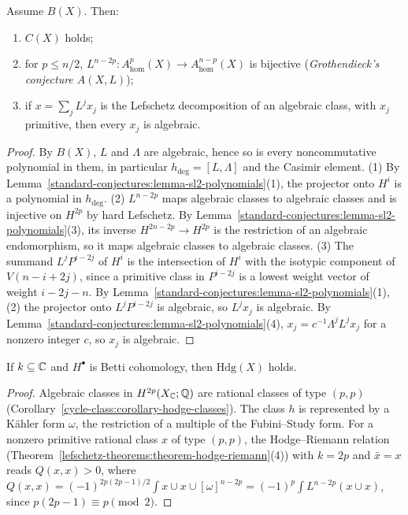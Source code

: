 \begin{proposition}\label{standard-conjectures:proposition-b-implies}
Assume $B(X)$. Then:
\begin{enumerate}
\item $C(X)$ holds;
\item for $p \leq n/2$, $L^{n-2p} \colon A^p_{\mathrm{hom}}(X) \to A^{n-p}_{\mathrm{hom}}(X)$ is bijective (\emph{Grothendieck's conjecture $A(X, L)$});
\item if $x = \sum_jL^jx_j$ is the Lefschetz decomposition of an algebraic class, with $x_j$ primitive, then every $x_j$ is algebraic.
\end{enumerate}
\end{proposition}

\begin{proof}
By $B(X)$, $L$ and $\Lambda$ are algebraic, hence so is every noncommutative polynomial in them, in particular $h_{\deg} = [L, \Lambda]$ and the Casimir element. (1) By
Lemma~\ref{standard-conjectures:lemma-sl2-polynomials}(1), the projector onto $H^i$ is a polynomial in $h_{\deg}$. (2) $L^{n-2p}$ maps algebraic classes to algebraic classes and is injective on $H^{2p}$ by hard
Lefschetz. By Lemma~\ref{standard-conjectures:lemma-sl2-polynomials}(3), its inverse $H^{2n-2p} \to H^{2p}$ is the restriction of an algebraic endomorphism, so it maps algebraic classes to algebraic classes.
(3) The summand $L^jP^{i-2j}$ of $H^i$ is the intersection of $H^i$ with the isotypic component of $V(n - i + 2j)$, since a primitive class in $P^{i-2j}$ is a lowest weight vector of weight $i - 2j - n$. By
Lemma~\ref{standard-conjectures:lemma-sl2-polynomials}(1),(2) the projector onto $L^jP^{i-2j}$ is algebraic, so $L^jx_j$ is algebraic. By Lemma~\ref{standard-conjectures:lemma-sl2-polynomials}(4),
$x_j = c^{-1}\Lambda^jL^jx_j$ for a nonzero integer $c$, so $x_j$ is algebraic.
\end{proof}

\begin{proposition}\label{standard-conjectures:proposition-hdg-char-zero}
If $k \subseteq \mathbb{C}$ and $H^\bullet$ is Betti cohomology, then $\mathrm{Hdg}(X)$ holds.
\end{proposition}

\begin{proof}
Algebraic classes in $H^{2p}(X_{\mathbb{C}}; \mathbb{Q})$ are rational classes of type $(p,p)$ (Corollary~\ref{cycle-class:corollary-hodge-classes}). The class $h$ is represented by a K\"ahler form $\omega$, the restriction of a
multiple of the Fubini--Study form. For a nonzero primitive rational class $x$ of type $(p,p)$, the Hodge--Riemann relation (Theorem~\ref{lefschetz-theorems:theorem-hodge-riemann}(4)) with $k = 2p$ and $\bar x = x$ reads
$Q(x, x) > 0$, where $Q(x, x) = (-1)^{2p(2p-1)/2}\int x \cup x \cup [\omega]^{n-2p} = (-1)^p\int L^{n-2p}(x \cup x)$, since $p(2p - 1) \equiv p \pmod 2$.
\end{proof}

